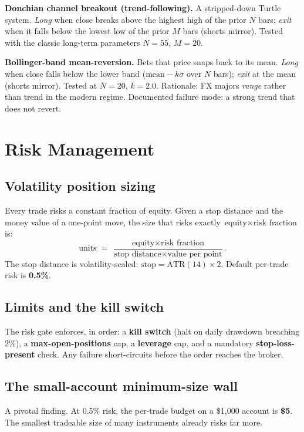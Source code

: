 \documentclass[11pt,a4paper]{article}
\begin{document}
\noindent\textbf{Donchian channel breakout (trend-following).} A stripped-down Turtle system. \emph{Long} when close breaks above the highest high of the prior $N$ bars; \emph{exit} when it falls below the lowest low of the prior $M$ bars (shorts mirror). Tested with the classic long-term parameters $N=55$, $M=20$.

\noindent\textbf{Bollinger-band mean-reversion.} Bets that price snaps back to its mean. \emph{Long} when close falls below the lower band ($\text{mean} - k\sigma$ over $N$ bars); \emph{exit} at the mean (shorts mirror). Tested at $N=20$, $k=2.0$. Rationale: FX majors \emph{range} rather than trend in the modern regime. Documented failure mode: a strong trend that does not revert.

\section{Risk Management}
\subsection{Volatility position sizing}
Every trade risks a constant fraction of equity. Given a stop distance and the money value of a one-point move, the size that risks exactly $\text{equity} \times \text{risk fraction}$ is:
\[ \text{units} \;=\; \frac{\text{equity} \times \text{risk fraction}}{\text{stop distance} \times \text{value per point}}. \]
The stop distance is volatility-scaled: $\text{stop} = \text{ATR}(14) \times 2$. Default per-trade risk is \textbf{0.5\%}.

\subsection{Limits and the kill switch}
The risk gate enforces, in order: a \textbf{kill switch} (halt on daily drawdown breaching 2\%), a \textbf{max-open-positions} cap, a \textbf{leverage} cap, and a mandatory \textbf{stop-loss-present} check. Any failure short-circuits before the order reaches the broker.

\subsection{The small-account minimum-size wall}\label{sec:minsize}
A pivotal finding. At 0.5\% risk, the per-trade budget on a \$1{,}000 account is \textbf{\$5}. The smallest tradeable size of many instruments already risks far more.
\end{document}
